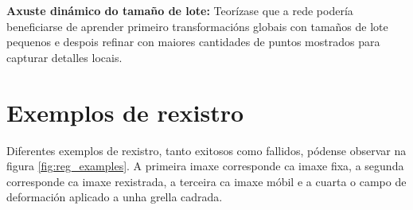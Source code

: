 \textbf{Axuste dinámico do tamaño de lote:} Teorízase que a rede podería beneficiarse de aprender primeiro transformacións globais con tamaños de lote pequenos e despois refinar con maiores cantidades de puntos mostrados para capturar detalles locais.



\section{Exemplos de rexistro}
\label{sec:Exemplos de rexistro}

Diferentes exemplos de rexistro, tanto exitosos como fallidos, pódense observar na figura \ref{fig:reg_examples}.
A primeira imaxe corresponde ca imaxe fixa, a segunda corresponde ca imaxe rexistrada, a terceira ca imaxe móbil e a cuarta o campo de deformación aplicado a unha grella cadrada.
 

